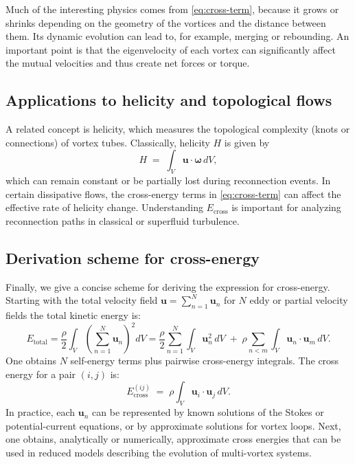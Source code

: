 Much of the interesting physics comes from \eqref{eq:cross-term}, because it
grows or shrinks depending on the geometry of the vortices and the distance between them.
Its dynamic evolution can lead to, for example, merging or rebounding. An important point is that
the eigenvelocity of each vortex can significantly affect the mutual velocities and thus
create net forces or torque.
\subsection{Applications to helicity and topological flows}
\label{sec:helicity}
A related concept is helicity, which measures the topological complexity (knots or
connections) of vortex tubes. Classically, helicity $H$ is given by
\begin{equation}
   H \;=\; \int_V \mathbf{u} \cdot \boldsymbol{\omega}\, dV,\label{eq:appendix:helicity}
\end{equation}
which can remain constant or be partially lost during reconnection events. In certain
dissipative flows, the cross-energy terms in \eqref{eq:cross-term} can affect the effective rate of helicity change. Understanding $E_{\text{cross}}$ is important
for analyzing reconnection paths in classical or superfluid turbulence.

\subsection{Derivation scheme for cross-energy}
\label{sec:derivation}
Finally, we give a concise scheme for deriving the expression for cross-energy. Starting with the total velocity field $\mathbf{u} = \sum_{n=1}^N \mathbf{u}_n$
for $N$ eddy or partial velocity fields the total kinetic energy is:
\begin{equation}
   E_{\text{total}}
   = \frac{\rho}{2} \int_V \left(\sum_{n=1}^N \mathbf{u}_n \right)^2 dV
   = \frac{\rho}{2} \sum_{n=1}^N \int_V \mathbf{u}_n^2 \, dV
   \;+\;\rho \sum_{n<m} \int_V \mathbf{u}_n \cdot \mathbf{u}_m \, dV.\label{eq:appendix:total-energy-derivation}
\end{equation}
One obtains $N$ self-energy terms plus pairwise cross-energy integrals.
The cross energy for a pair $(i,j)$ is:
\begin{equation}
   E_{\text{cross}}^{(ij)} \;=\; \rho \int_V \mathbf{u}_i \cdot \mathbf{u}_j \, dV.\label{eq:appendix:cross-energy-derivation}
\end{equation}
In practice, each $\mathbf{u}_n$ can be represented by known solutions of the Stokes or potential-current equations, or by approximate solutions for vortex loops. Next, one obtains, analytically or numerically, approximate cross energies
that can be used in reduced models describing the evolution of multi-vortex systems.

